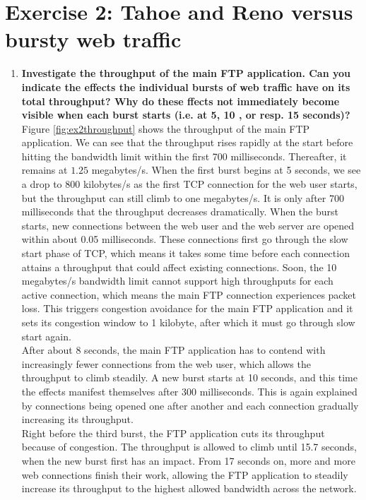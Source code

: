 \documentclass[a4paper,10pt]{article}
\begin{document}
\section{Exercise 2: Tahoe and Reno versus bursty web traffic}
\begin{enumerate}
 \item \textbf{Investigate the throughput of the main FTP application. Can you indicate the effects the
 individual bursts of web traffic have on its total throughput? Why do these ffects not immediately
 become visible when each burst starts (i.e. at 5, 10 , or resp. 15 seconds)?} \\
 
 Figure \ref{fig:ex2throughput} shows the throughput of the main FTP application. We can see that the throughput rises
 rapidly at the start before hitting the bandwidth limit within the first 700 milliseconds. Thereafter, it remains at $1.25$
 megabytes/s. When the first burst begins at 5 seconds, we see a drop to 800 kilobytes/s as the first TCP connection for the web user
 starts, but the throughput can still climb to one megabytes/s. It is only after 700 milliseconds that the throughput
 decreases dramatically. When the burst starts, new connections between the web user and the web server are opened within
 about 0.05 milliseconds. These connections first go through the slow start phase of TCP, which means it takes some time
 before each connection attains a throughput that could affect existing connections. Soon, the 10 megabytes/s bandwidth
 limit cannot support high throughputs for each active connection, which means the main FTP connection experiences packet loss. This triggers
 congestion avoidance for the main FTP application and it sets its congestion window to 1 kilobyte, after which it
 must go through slow start again. \\
 
 After about 8 seconds, the main FTP application has to contend with increasingly fewer connections from the web user,
 which allows the throughput to climb steadily. A new burst starts at 10 seconds, and this time the effects manifest
 themselves after 300 milliseconds. This is again explained by connections being opened one after another and
 each connection gradually increasing its throughput. \\
 
 Right before the third burst, the FTP application cuts its throughput because of congestion. The throughput is allowed
 to climb until 15.7 seconds, when the new burst first has an impact. From 17 seconds on, more and more web connections
 finish their work, allowing the FTP application to steadily increase its throughput to the highest allowed bandwidth
 across the network.
 

\end{enumerate}
\end{document}

